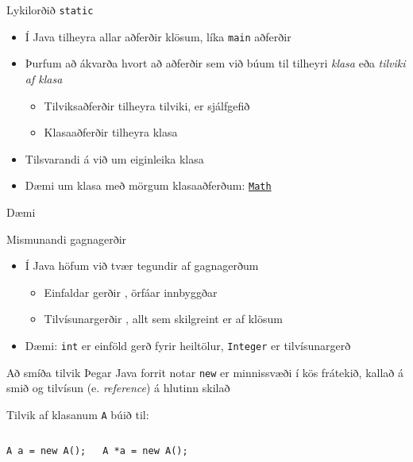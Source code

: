 \documentclass{beamer}
\begin{document}
\begin{frame}{Lykilorðið \texttt{static}}
	\begin{itemize}
		\item Í Java tilheyra allar aðferðir klösum, líka \texttt{main} aðferðir
		\item Þurfum að ákvarða hvort að aðferðir sem við búum til tilheyri \emph{klasa} eða \emph{tilviki af klasa}
		      \begin{itemize}
			      \item Tilviksaðferðir  tilheyra tilviki, er sjálfgefið
			      \item Klasaaðferðir  tilheyra klasa
		      \end{itemize}
		\item Tilsvarandi á við um eiginleika klasa 
		\item Dæmi um klasa með mörgum klasaaðferðum: \href{https://docs.oracle.com/javase/8/docs/api/java/lang/Math.html}{\texttt{Math}}
	\end{itemize}
\end{frame}

\begin{frame}{Dæmi}
\end{frame}

\begin{frame}[fragile]{Mismunandi gagnagerðir}
	\begin{itemize}
		\item Í Java höfum við tvær tegundir af gagnagerðum
		      \begin{itemize}
			      \item Einfaldar gerðir , örfáar innbyggðar
			      \item Tilvísunargerðir , allt sem skilgreint er af klösum
		      \end{itemize}
		\item Dæmi: \texttt{int} er einföld gerð fyrir heiltölur, \texttt{Integer} er tilvísunargerð
	\end{itemize}
\end{frame}

\begin{frame}[fragile]{Að smíða tilvik}
	Þegar Java forrit notar \texttt{new} er minnissvæði í kös frátekið, kallað á smið og tilvísun (e. \emph{reference}) á hlutinn skilað
	\begin{center}
		Tilvik af klasanum \texttt{A} búið til:

		\vspace{-0.5cm}
	\end{center}
	\begin{columns}
		\begin{verbatim}
A a = new A();
\end{verbatim}
		\begin{verbatim}
A *a = new A();
\end{verbatim}
	\end{columns}
\end{frame}
\end{document}
